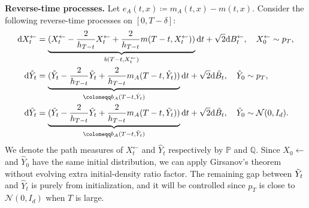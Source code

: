 \documentclass[11pt]{article}
\newcommand{\mb}{\mathbb}
\newcommand{\dee}{\mathrm{d}}
\newcommand{\mc}{\mathcal}
\begin{document}
\noindent \textbf{Reverse-time processes.} Let $e_A(t,x)\coloneqq m_A(t,x)-m(t,x)$. Consider the following reverse-time processes on $[0,T-\delta]$:
\begin{align*}
    \dee X_t^{\leftarrow} &= \underbrace{( X_t^\leftarrow-\frac{2}{h_{T-t}}X_t^\leftarrow +\frac{2}{h_{T-t}}m(T-t,X_t^\leftarrow) ) }_{b(T-t,X_t^\leftarrow)}\dee t + \sqrt{2}\dee B_t^\leftarrow, \quad X_0^\leftarrow\sim p_T, \\
       \dee \hat{Y}_t &= \underbrace{(\hat{Y}_t -\frac{2}{h_{T-t}}\hat{Y}_t + \frac{2}{h_{T-t}} m_A(T-t,\hat{Y}_t))}_{\coloneqq b_A(T-t,\hat{Y}_t)} \dee t +\sqrt{2} \dee \Tilde{B}_t,  \quad \hat{Y}_0\sim p_T, \\  
    \dee \Tilde{Y}_t &= \underbrace{(\Tilde{Y}_t -\frac{2}{h_{T-t}}\Tilde{Y}_t + \frac{2}{h_{T-t}} m_A(T-t,\Tilde{Y}_t))}_{\coloneqq b_A(T-t,\Tilde{Y}_t)} \dee t +\sqrt{2} \dee \Tilde{B}_t,  \quad \Tilde{Y}_0\sim \mc{N}(0,I_d).
\end{align*}
We denote the path measures of $X_t^\leftarrow$ and $\hat{Y}_t$ respectively by $\mb{P}$ and $\mb{Q}$. Since $X_0\leftarrow$ and $\hat{Y}_0$ have the same initial distribution, we can apply Girsanov's theorem without evolving extra initial-density ratio factor. The remaining gap between $\Tilde{Y}_t$ and $\hat{Y}_t$ is purely from initialization, and it will be controlled since $p_T$ is close to $\mc{N}(0,I_d)$ when $T$ is large.
\end{document}
